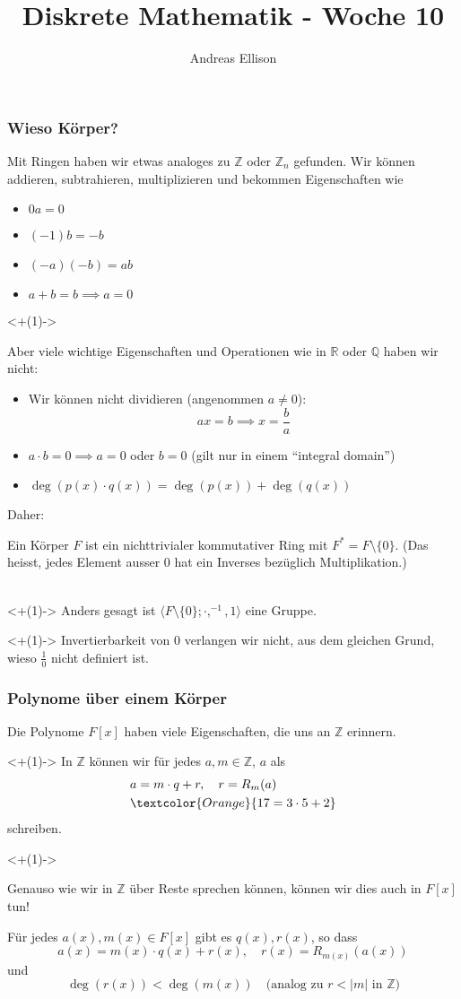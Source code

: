 \documentclass[t,dvipsnames]{beamer}
\title{Diskrete Mathematik - Woche 10}
\author{Andreas Ellison}
\newcommand{\domZ}{\mathbb{Z}}
\begin{document}
\begin{frame}
	\frametitle{Wieso Körper?}
	Mit Ringen haben wir etwas analoges zu $\mathbb{Z}$ oder $\mathbb{Z}_n$ gefunden. Wir können addieren, subtrahieren, multiplizieren und bekommen Eigenschaften wie
	\begin{itemize}[<+(1)->]
		\item $0a = 0$
		\item $(-1)b = -b$
		\item $(-a)(-b) = ab$
		\item $a + b = b \implies a = 0$
	\end{itemize}

	\only<+(1)->{Aber viele wichtige Eigenschaften und Operationen wie in $\mathbb{R}$ oder $\mathbb{Q}$ haben wir nicht:
		\begin{itemize}[<+(1)->]
			\item Wir können nicht dividieren (angenommen $a \neq 0$):
			      $$
				      ax = b \implies x = \frac{b}{a}
			      $$
			\item $a \cdot b = 0 \implies a = 0 $ oder $b = 0$ (gilt nur in einem ``integral domain'')
			\item $\deg(p(x) \cdot q(x)) = \deg(p(x)) + \deg(q(x))$
		\end{itemize}
	}
\end{frame}

\begin{frame}
	Daher:
	\begin{Definition}[5.26.]
		Ein Körper $F$ ist ein nichttrivialer kommutativer Ring mit $F^* = F \setminus \{0\}$. (Das heisst, jedes Element ausser 0 hat ein Inverses bezüglich Multiplikation.) \\~

		\only<+(1)->{
			Anders gesagt ist $\langle F \setminus \{0\}; \cdot, ^{-1}, 1 \rangle$ eine Gruppe.
		}
	\end{Definition}
	\only<+(1)->{
		Invertierbarkeit von $0$ verlangen wir nicht, aus dem gleichen Grund, wieso $\frac{1}{0}$ nicht definiert ist.
	}

\end{frame}

\begin{frame}
	\frametitle{Polynome über einem Körper}
	Die Polynome $F[x]$ haben viele Eigenschaften, die uns an $\mathbb{Z}$ erinnern.

	\only<+(1)->{
		In $\mathbb{Z}$ können wir für jedes $a, m \in \domZ$, $a$ als
		\begin{align*}
			 & a = m \cdot q + r, \quad r = R_m(a)
			\\ & \textcolor{Orange}{17 = 3 \cdot 5 + 2}
		\end{align*}
		schreiben.
	}

	\only<+(1)->{
		Genauso wie wir in $\mathbb{Z}$ über Reste sprechen können, können wir dies auch in $F[x]$ tun!
		\begin{Satz}[5.25.]
			Für jedes $a(x), m(x) \in F[x]$ gibt es $q(x), r(x)$, so dass
			$$
				a(x) = m(x) \cdot q(x) + r(x), \quad r(x) = R_{m(x)}(a(x))
			$$
			und
			$$
				\deg(r(x)) < \deg(m(x)) \quad \text{(analog zu $r < |m|$ in $\mathbb{Z}$)}
			$$
		\end{Satz}
	}
\end{frame}
\end{document}

